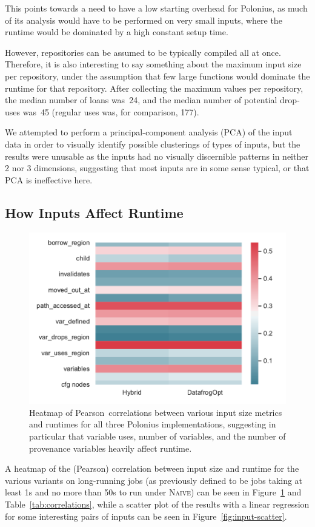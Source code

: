 \documentclass[11pt,a4paper,twoside,openany]{report}
\begin{document}
This points towards a need to have a low starting overhead for Polonius, as
much of its analysis would have to be performed on very small inputs, where the
runtime would be dominated by a high constant setup time.

However, repositories can be assumed to be typically compiled all at once.
Therefore, it is also interesting to say something about the maximum input size
per repository, under the assumption that few large functions would dominate the
runtime for that repository. After collecting the maximum values per repository,
the median number of loans was~24, and the median number of potential drop-uses
was~45 (regular uses was, for comparison, 177).

We attempted to perform a principal-component analysis (PCA) of the input data
in order to visually identify possible clusterings of types of inputs, but the
results were unusable as the inputs had no visually discernible patterns in
neither 2 nor 3 dimensions, suggesting that most inputs are in some sense
typical, or that PCA is ineffective here.

\subsection{How Inputs Affect Runtime}\label{sec:inputs:correlation}
\begin{figure}
  \includegraphics[width=0.9\linewidth]{Graphs/corr_heatmap.pdf}
  \caption[Heatmap of Input Sizes Affecting Runtime]{Heatmap of
    Pearson~correlations between various input size metrics and runtimes for
    all three Polonius implementations, suggesting in particular that variable
    uses, number of variables, and the number of provenance variables heavily
    affect runtime.}
  \label{fig:corr-heatmap}
\end{figure}
A heatmap of the (Pearson) correlation between input size and runtime for the
various variants on long-running jobs (as previously defined to be jobs taking
at least 1s and no more than 50s to run under \textsc{Naive}) can be seen in
Figure~\ref{fig:corr-heatmap} and Table~\ref{tab:correlations}, while a scatter
plot of the results with a linear regression for some interesting pairs of
inputs can be seen in Figure~\ref{fig:input-scatter}.
\end{document}
